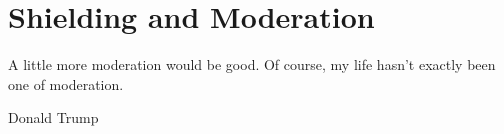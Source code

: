 \chapter{Shielding and Moderation}
\epigraph{A little more moderation would be good. Of course, my life hasn't exactly been one of moderation.}{Donald Trump}
